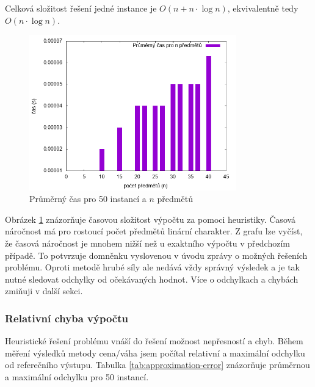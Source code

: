\documentclass{article}
\begin{document}
Celková složitost řešení jedné instance je $O(n + n \cdot \log n)$, ekvivalentně tedy $O(n \cdot \log n)$.

\begin{figure}[h]
    \centering
    \includegraphics[width=0.8\textwidth]{heuristic-duration.png}
    \caption{Průměrný čas pro 50 instancí a $n$ předmětů}
    \label{fig:g2}
\end{figure}

Obrázek \ref{fig:g2} znázorňuje časovou složitost výpočtu za pomoci heuristiky.
Časová náročnost má pro rostoucí počet předmětů linární charakter.
Z grafu lze vyčíst, že časová náročnost je mnohem nižší než u exaktního výpočtu v předchozím případě.
To potvrzuje domněnku vyslovenou v úvodu zprávy o možných řešeních problému.
Oproti metodě hrubé síly ale nedává vždy správný výsledek a je tak nutné sledovat odchylky od očekávaných hodnot.
Více o odchylkach a chybách zmiňuji v další sekci.


\subsubsection*{Relativní chyba výpočtu}

Heuristické řešení problému vnáší do řešení možnost nepřesností a chyb.
Během měření výsledků metody cena/váha jsem počítal relativní a maximální odchylku od referečního výstupu.
Tabulka \ref{tab:approximation-error} znázorňuje průměrnou a maximální odchylku pro 50 instancí.
\end{document}
